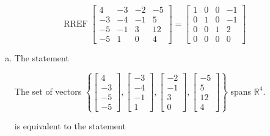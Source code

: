 \begin{exerciseAnswer} 


\[\operatorname{RREF} \left[\begin{array}{cccc}
4 & -3 & -2 & -5 \\
-3 & -4 & -1 & 5 \\
-5 & -1 & 3 & 12 \\
-5 & 1 & 0 & 4
\end{array}\right] = \left[\begin{array}{cccc}
1 & 0 & 0 & -1 \\
0 & 1 & 0 & -1 \\
0 & 0 & 1 & 2 \\
0 & 0 & 0 & 0
\end{array}\right] \]


\begin{enumerate}[(a)]
\item The statement 
\begin{center}\begin{minipage}{0.8\textwidth}
 The set of vectors \( \left\{ \left[\begin{array}{c}
4 \\
-3 \\
-5 \\
-5
\end{array}\right] , \left[\begin{array}{c}
-3 \\
-4 \\
-1 \\
1
\end{array}\right] , \left[\begin{array}{c}
-2 \\
-1 \\
3 \\
0
\end{array}\right] , \left[\begin{array}{c}
-5 \\
5 \\
12 \\
4
\end{array}\right] \right\} \) spans \(\mathbb{R}^4\). 
\end{minipage}\end{center}
     is equivalent to the statement 
\begin{center}\begin{minipage}{0.8\textwidth}
 The vector equation \( x_{1} \left[\begin{array}{c}
4 \\
-3 \\

\end{array}
\end{minipage}
\end{center}
\end{enumerate}
\end{exerciseAnswer}
